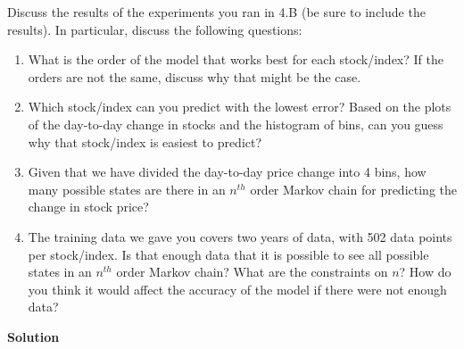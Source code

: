 \documentclass{article}
\begin{document}
Discuss the results of the experiments you ran in 4.B (be sure to include the results). In particular, discuss the following questions:

\begin{enumerate}
    \item What is the order of the model that works best for each stock/index? If the orders are not the same, discuss why that might be the case.
    
    \item Which stock/index can you predict with the lowest error? Based on the plots of the day-to-day change in stocks and the histogram of bins, can you guess why that stock/index is easiest to predict?
    
    \item Given that we have divided the day-to-day price change into 4 bins, how many possible states are there in an $n^{th}$ order Markov chain for predicting the change in stock price?
    
    \item The training data we gave you covers two years of data, with 502 data points per stock/index. Is that enough data that it is possible to see all possible states in an $n^{th}$ order Markov chain? What are the constraints on $n$? How do you think it would affect the accuracy of the model if there were not enough data?
\end{enumerate}
   
\textbf{Solution}
\end{document}
